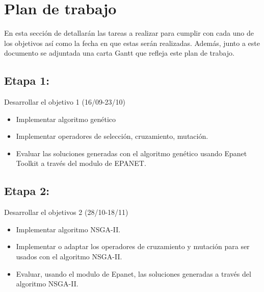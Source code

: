 \documentclass[11pt,letterpaper]{article}
\begin{document}
\section{Plan de trabajo}


En esta sección de detallarán las tareas a realizar para cumplir con cada uno de los objetivos así como la fecha en que estas serán realizadas. Además, junto a este documento se adjuntada una carta Gantt que refleja este plan de trabajo.

\subsection{Etapa 1:} Desarrollar el objetivo 1 (16/09-23/10)
\begin{itemize}
	\item Implementar algoritmo genético
	\item Implementar operadores de selección, cruzamiento, mutación.
	\item Evaluar las soluciones generadas con el algoritmo genético usando Epanet Toolkit a través del modulo de EPANET.
\end{itemize}

\subsection{Etapa 2:} Desarrollar el objetivos 2 (28/10-18/11)
\begin{itemize}
	\item Implementar algoritmo NSGA-II.
	\item Implementar o adaptar los operadores de cruzamiento y mutación para ser usados con el algoritmo NSGA-II.
	\item Evaluar, usando el modulo de Epanet, las soluciones generadas a través del algoritmo NSGA-II.
\end{itemize}
\end{document}

